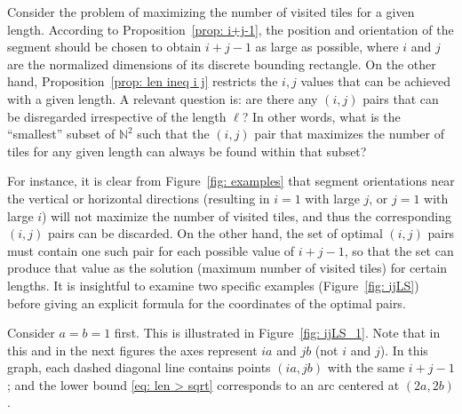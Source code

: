 \documentclass[12pt, a4paper]{article}
\newcommand{\len}{\ell} %
\begin{document}
Consider the problem of maximizing the number of visited tiles for a given length. According to Proposition~\ref{prop: i+j-1}, the position and orientation of the segment should be chosen to obtain $i+j-1$ as large as possible, where $i$ and $j$ are the normalized dimensions of its discrete bounding rectangle. On the other hand, Proposition~\ref{prop: len ineq i j} restricts the $i, j$ values that can be achieved with a given length. A relevant question is: are there any $(i,j)$ pairs that can be disregarded irrespective of the length $\len$? In other words, what is the ``smallest'' subset of $\mathbb N^2$ such that the $(i,j)$ pair that maximizes the number of tiles for any given length can always be found within that subset?

For instance, it is clear from Figure~\ref{fig: examples} that segment orientations near the vertical or horizontal directions (resulting in $i=1$ with large $j$, or $j=1$ with large $i$) will not maximize the number of visited tiles, and thus the corresponding $(i,j)$ pairs can be discarded. On the other hand, the set of optimal $(i,j)$ pairs must contain one such pair for each possible value of $i+j-1$, so that the set can produce that value as the solution (maximum number of visited tiles) for certain lengths. It is insightful to examine two specific examples (Figure~\ref{fig: ijLS}) before giving an explicit formula for the coordinates of the optimal pairs.

Consider $a=b=1$ first. This is illustrated in Figure~\ref{fig: ijLS_1}. Note that in this and in the next figures the axes represent $ia$ and $jb$ (not $i$ and $j$). In this graph, each dashed diagonal line contains points $(ia,jb)$ with the same $i+j-1$; and the lower bound \eqref{eq: len > sqrt} corresponds to an arc centered at $(2a,2b)$.
\end{document}

